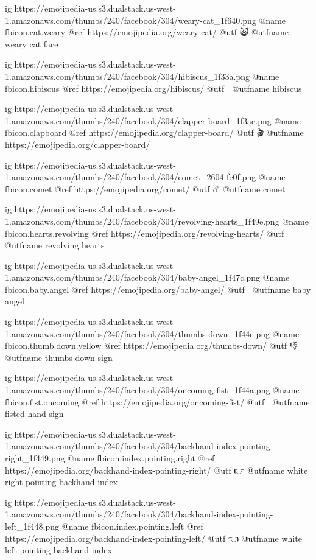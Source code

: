   ig https://emojipedia-us.s3.dualstack.us-west-1.amazonaws.com/thumbs/240/facebook/304/weary-cat_1f640.png
  @name fbicon.cat.weary
  @ref https://emojipedia.org/weary-cat/
  @utf 🙀
  @utfname weary cat face

  ig https://emojipedia-us.s3.dualstack.us-west-1.amazonaws.com/thumbs/240/facebook/304/hibiscus_1f33a.png
  @name fbicon.hibiscus
  @ref https://emojipedia.org/hibiscus/
  @utf 🌺
  @utfname hibiscus

  ig https://emojipedia-us.s3.dualstack.us-west-1.amazonaws.com/thumbs/240/facebook/304/clapper-board_1f3ac.png
  @name fbicon.clapboard
  @ref https://emojipedia.org/clapper-board/
  @utf 🎬
  @utfname https://emojipedia.org/clapper-board/

  ig https://emojipedia-us.s3.dualstack.us-west-1.amazonaws.com/thumbs/240/facebook/304/comet_2604-fe0f.png
  @name fbicon.comet
  @ref https://emojipedia.org/comet/
  @utf ☄️
  @utfname comet

  ig https://emojipedia-us.s3.dualstack.us-west-1.amazonaws.com/thumbs/240/facebook/304/revolving-hearts_1f49e.png
  @name fbicon.hearts.revolving
  @ref https://emojipedia.org/revolving-hearts/
  @utf 💞
  @utfname revolving hearts

  ig https://emojipedia-us.s3.dualstack.us-west-1.amazonaws.com/thumbs/240/facebook/304/baby-angel_1f47c.png
  @name fbicon.baby.angel
  @ref https://emojipedia.org/baby-angel/
  @utf 👼
  @utfname baby angel

  ig https://emojipedia-us.s3.dualstack.us-west-1.amazonaws.com/thumbs/240/facebook/304/thumbs-down_1f44e.png
  @name fbicon.thumb.down.yellow
  @ref https://emojipedia.org/thumbs-down/
  @utf 👎
  @utfname thumbs down sign

	ig https://emojipedia-us.s3.dualstack.us-west-1.amazonaws.com/thumbs/240/facebook/304/oncoming-fist_1f44a.png
	@name fbicon.fist.oncoming
	@ref https://emojipedia.org/oncoming-fist/
	@utf 👊
	@utfname fisted hand sign

	ig https://emojipedia-us.s3.dualstack.us-west-1.amazonaws.com/thumbs/240/facebook/304/backhand-index-pointing-right_1f449.png
	@name fbicon.index.pointing.right
	@ref https://emojipedia.org/backhand-index-pointing-right/
	@utf 👉
	@utfname white right pointing backhand index

	ig https://emojipedia-us.s3.dualstack.us-west-1.amazonaws.com/thumbs/240/facebook/304/backhand-index-pointing-left_1f448.png
	@name fbicon.index.pointing.left
	@ref https://emojipedia.org/backhand-index-pointing-left/
	@utf 👈
	@utfname white left pointing backhand index

